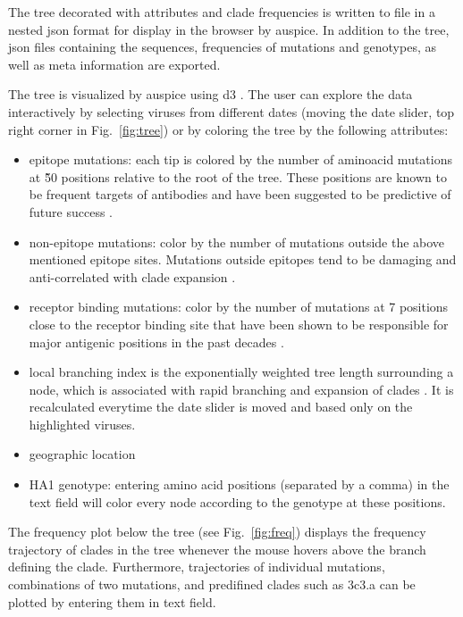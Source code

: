 \documentclass{bioinfo}
\newcommand{\FIG}[1]{Fig.~\ref{fig:#1}}
\begin{document}
The tree decorated with attributes and clade frequencies is written to file in a nested json format for display in the browser by auspice.
In addition to the tree, json files containing the sequences, frequencies of mutations and genotypes, as well as meta information are exported.

The tree is visualized by auspice using d3 \citep{d3}.
The user can explore the data interactively by selecting viruses from different dates (moving the date slider, top right corner in \FIG{tree}) or by coloring the tree by the following attributes:
\begin{itemize}
	\item epitope mutations: each tip is colored by the number of aminoacid mutations at \~50 positions relative to the root of the tree.
These positions are known to be frequent targets of antibodies \citep{shih_simultaneous_2007} and have been suggested to be predictive of future success \citep{luksza_predictive_2014}.
	\item non-epitope mutations: color by the number of mutations outside the above mentioned epitope sites.
	Mutations outside epitopes tend to be damaging and anti-correlated with clade expansion \citep{luksza_predictive_2014}.
    \item receptor binding mutations: color by the number of mutations at 7 positions close to the receptor binding site that have been shown to be responsible for major antigenic positions in the past decades \citep{koel_substitutions_2013}.
    \item local branching index is the exponentially weighted tree length surrounding a node, which is associated with rapid branching and expansion of clades \citep{neher_predicting_2014}.
It is recalculated everytime the date slider is moved and based only on the highlighted viruses.
    \item geographic location
    \item HA1 genotype: entering amino acid positions (separated by a comma) in the text field will color every node according to the genotype at these positions.
\end{itemize}

The frequency plot below the tree (see \FIG{freq}) displays the frequency trajectory of clades in the tree whenever the mouse hovers above the branch defining the clade. 
Furthermore, trajectories of individual mutations, combinations of two mutations, and predifined clades such as 3c3.a can be plotted by entering them in text field.
\end{document}
